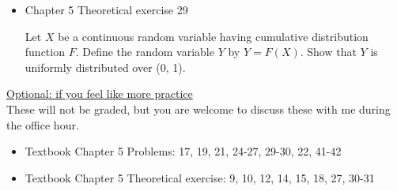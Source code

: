 \documentclass[11pt]{article}
\begin{document}
\begin{itemize}
    \item 
    
    Chapter 5 Theoretical exercise 29
    
    Let $X$ be a continuous random variable having cumulative distribution function $F$. Define the random variable $Y$ by $Y = F(X)$. Show that $Y$ is uniformly distributed over (0, 1).
    
    



\end{itemize}


\vspace{12pt}

\underline{Optional: if you feel like more practice}\\
These will not be graded, but you are welcome to discuss these with me during the office hour.

\begin{itemize}


\item Textbook  Chapter 5 Problems: 17, 19, 21, 24-27, 29-30, 22, 41-42
\item Textbook  Chapter 5 Theoretical exercise: 9, 10, 12, 14, 15, 18, 27, 30-31

\end{itemize}
\end{document}
